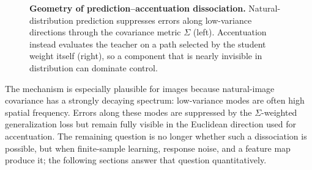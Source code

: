 \documentclass{article}
\theoremstyle{plain}
\theoremstyle{definition}
\begin{document}
\begin{figure}[t]
    \centering
    \caption{\textbf{Geometry of prediction--accentuation dissociation.}
    Natural-distribution prediction suppresses errors along low-variance directions through the covariance metric $\Sigma$ (left).
    Accentuation instead evaluates the teacher on a path selected by the student weight itself (right), so a component that is nearly invisible in distribution can dominate control.}
    \label{fig:linear-dissociation-geometry}
\end{figure}

The mechanism is especially plausible for images because natural-image covariance has a strongly decaying spectrum: low-variance modes are often high spatial frequency.
Errors along these modes are suppressed by the $\Sigma$-weighted generalization loss but remain fully visible in the Euclidean direction used for accentuation.
The remaining question is no longer whether such a dissociation is possible, but when finite-sample learning, response noise, and a feature map produce it; the following sections answer that question quantitatively.
\end{document}
